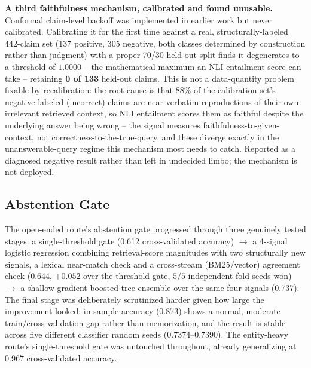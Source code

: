 \documentclass[a4paper,twoside]{article}
\begin{document}
\textbf{A third faithfulness mechanism, calibrated and found unusable.} Conformal claim-level backoff \citep{mohri2024conformal} was implemented in earlier work but never calibrated. Calibrating it for the first time against a real, structurally-labeled 442-claim set (137 positive, 305 negative, both classes determined by construction rather than judgment) with a proper 70/30 held-out split finds it degenerates to a threshold of $1.0000$ -- the mathematical maximum an NLI entailment score can take -- retaining \textbf{0 of 133} held-out claims. This is not a data-quantity problem fixable by recalibration: the root cause is that $88\%$ of the calibration set's negative-labeled (incorrect) claims are near-verbatim reproductions of their own irrelevant retrieved context, so NLI entailment scores them as faithful despite the underlying answer being wrong -- the signal measures faithfulness-to-given-context, not correctness-to-the-true-query, and these diverge exactly in the unanswerable-query regime this mechanism most needs to catch. Reported as a diagnosed negative result rather than left in undecided limbo; the mechanism is not deployed.

\subsection{Abstention Gate}
\label{subsec:results-abstention}

The open-ended route's abstention gate progressed through three genuinely tested stages: a single-threshold gate (0.612 cross-validated accuracy) $\to$ a 4-signal logistic regression combining retrieval-score magnitudes with two structurally new signals, a lexical near-match check and a cross-stream (BM25/vector) agreement check (0.644, $+0.052$ over the threshold gate, $5/5$ independent fold seeds won) $\to$ a shallow gradient-boosted-tree ensemble over the same four signals (0.737). The final stage was deliberately scrutinized harder given how large the improvement looked: in-sample accuracy (0.873) shows a normal, moderate train/cross-validation gap rather than memorization, and the result is stable across five different classifier random seeds (0.7374--0.7390). The entity-heavy route's single-threshold gate was untouched throughout, already generalizing at 0.967 cross-validated accuracy.
\end{document}
